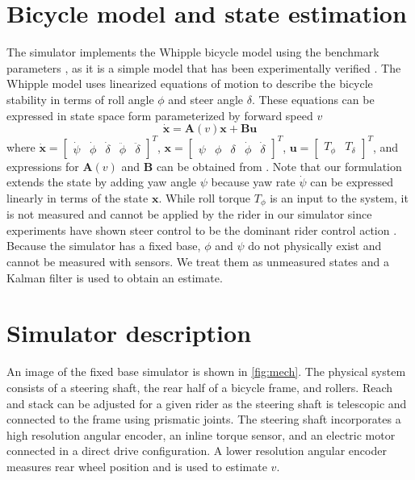 \documentclass{icsc}
\newcommand{\dstate}{\dot{\bm{x}}}
\newcommand{\state}{\bm{x}}
\newcommand{\sysInput}{\bm{u}}
\newcommand{\stateMat}{\bm{A}}
\newcommand{\inputMat}{\bm{B}}
\newcommand{\yaw}{\psi}
\newcommand{\roll}{\phi}
\newcommand{\steer}{\delta}
\newcommand{\yawRate}{\dot{\psi}}
\newcommand{\rollRate}{\dot{\phi}}
\newcommand{\steerRate}{\dot{\delta}}
\newcommand{\rollAccel}{\ddot{\phi}}
\newcommand{\steerAccel}{\ddot{\delta}}
\begin{document}
\section{Bicycle model and state estimation}
\label{sec:model_and_estimator}
The simulator implements the Whipple bicycle model using the benchmark parameters \cite{meijaard2007linearized}, as it is
a simple model that has been experimentally verified \cite{kooijman2008experimental}.
The Whipple model uses linearized equations of motion to describe the bicycle stability in terms of roll angle $\roll$ and
steer angle $\steer$.
These equations can be expressed in state space form parameterized by forward speed $v$
\begin{equation}
    \dstate = \stateMat{(v)} \state + \inputMat \sysInput \label{eq:state_space}
\end{equation}
where $ \dstate = \begin{bmatrix} \yawRate & \rollRate & \steerRate & \rollAccel & \steerAccel \end{bmatrix}^T $,
$ \state = \begin{bmatrix} \yaw & \roll & \steer& \rollRate & \steerRate \end{bmatrix}^T $,
$ \sysInput = \begin{bmatrix} T_\roll & T_\steer  \end{bmatrix}^T $, and expressions for $ \stateMat(v) $ and
$ \inputMat $ can be obtained from \cite{meijaard2007linearized}.
Note that our formulation extends the state by adding yaw angle $ \yaw $ because yaw rate $ \yawRate $ can be expressed linearly in terms of the state $\state$.
While roll torque $ T_\roll $ is an input to the system, it is not measured and cannot be applied by the
rider in our simulator since experiments have shown steer control to be the dominant rider control
action \cite{moore2011rider}.
Because the simulator has a fixed base, $\roll$ and $\yaw$ do not physically exist and cannot be measured
with sensors.
We treat them as unmeasured states and a Kalman filter is used to obtain an estimate.

\section{Simulator description}
An image of the fixed base simulator is shown in \autoref{fig:mech}. The physical system consists of a steering shaft,
the rear half of a bicycle frame, and rollers.
Reach and stack can be adjusted for a given rider as the steering shaft is telescopic and connected to the frame using
prismatic joints.
The steering shaft incorporates a high resolution angular encoder, an inline torque sensor, and an
electric motor connected in a direct drive configuration.
A lower resolution angular encoder measures rear wheel position and is used to estimate $v$.
\end{document}
